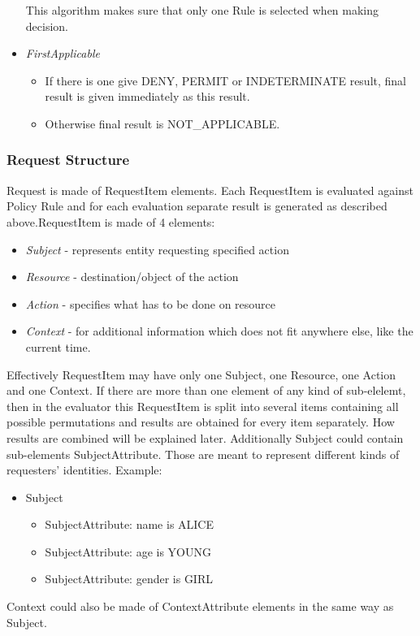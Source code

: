 \documentclass{article}                            %
\begin{document}
\begin{itemize}
This algorithm makes sure that only one Rule is selected when making decision.

    \item  \emph{FirstApplicable}

    \begin{itemize}
        \item If there is one give DENY, PERMIT or INDETERMINATE result, final result is given immediately as this result.
        \item Otherwise final result is NOT\_APPLICABLE.
    \end{itemize}

\end{itemize}


\subsubsection{Request Structure} %
\label{subsubsec:request_structure}

Request is made of RequestItem elements. Each RequestItem is evaluated against Policy Rule and for each evaluation separate result is generated as described above.RequestItem is made of 4 elements:
    \begin{itemize}
        \item \emph{Subject} - represents entity requesting specified action
        \item \emph{Resource} - destination/object of the action
        \item \emph{Action} - specifies what has to be done on resource
        \item \emph{Context} - for additional information which does not fit anywhere else, like the current time.
    \end{itemize}

Effectively RequestItem may have only one Subject, one Resource, one Action and one Context. If there are more than one element of any kind of sub-elelemt, then in the evaluator this RequestItem is split into several items containing all possible permutations and results are obtained for every item separately. How results are combined will be explained later.
Additionally Subject could contain sub-elements SubjectAttribute. Those are meant to represent different kinds of requesters' identities. Example:

    \begin{itemize}
        \item Subject
        \begin{itemize}
            \item SubjectAttribute: name is ALICE
            \item SubjectAttribute: age is YOUNG
            \item SubjectAttribute: gender is GIRL
        \end{itemize}
    \end{itemize}
Context could also be made of ContextAttribute elements in the same way as Subject.
\end{document}

